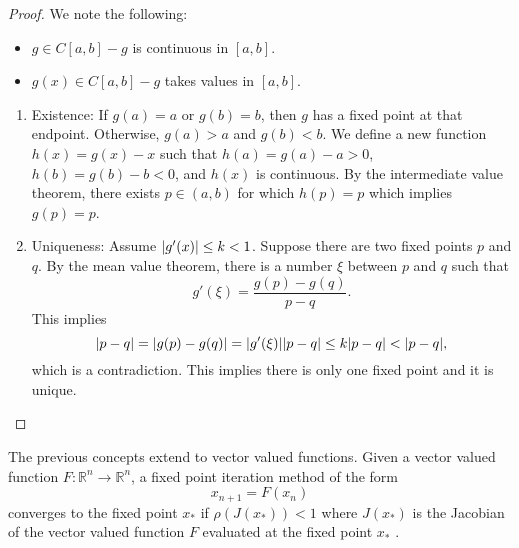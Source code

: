 \begin{proof}
We note the following:
	\begin{itemize}
		\item $g \in C[a,b] - g$ is continuous in $[a,b]$.
		\item $g(x) \in C[a,b] - g$ takes values in $[a,b]$.
	\end{itemize}
	\begin{enumerate}
		\item Existence: If $g(a) = a$ or $g(b) = b$, then $g$ has a fixed point at that endpoint. Otherwise, $g(a) > a$ and $g(b) < b$. We define a new function $h(x) = g(x) - x$ such that $h(a) = g(a) - a > 0$, $h(b) = g(b) - b < 0$, and $h(x)$ is continuous. By the intermediate value theorem, there exists $p \in (a,b)$ for which $h(p) = p$ which implies $g(p) = p$.
		\item Uniqueness: Assume $\lvert g'(x)\rvert \leq k < 1$. Suppose there are two fixed points $p$ and $q$. By the mean value theorem, there is a number $\xi$ between $p$ and $q$ such that
			\begin{equation}
				g'(\xi) = \frac{g(p) - g(q)}{p-q}.
			\end{equation}
			This implies
			\begin{equation}
				\lvert p-q\rvert = \lvert g(p) - g(q)\rvert = \lvert g'(\xi)\rvert\lvert p-q\rvert \leq k \lvert p-q\rvert < \lvert p-q\rvert,
			\end{equation}
			which is a contradiction. This implies there is only one fixed point and it is unique.
	\end{enumerate}
\end{proof}

The previous concepts extend to vector valued functions. Given a vector valued function $F: \mathbb{R}^{n} \rightarrow \mathbb{R}^{n}$, a fixed point iteration method of the form
\begin{equation}
	x_{n+1} = F(x_{n})
\end{equation}
converges to the fixed point $x_{*}$ if $\rho(J(x_{*})) < 1$ where $J(x_{*})$ is the Jacobian of the vector valued function $F$ evaluated at the fixed point $x_{*}$ \cite{ostrowski_solution_2016}. 